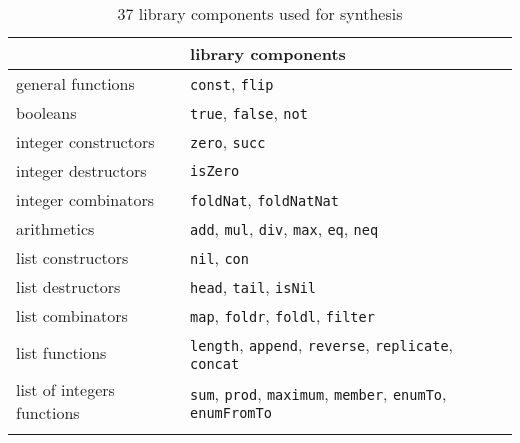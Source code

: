 \begin{longtable}{l  p{}}
\toprule
 & library components\\
\midrule
general functions & \lstinline!const!, \lstinline?flip?\\
booleans & \lstinline?true?, \lstinline?false?, \lstinline?not?\\
integer constructors & \lstinline?zero?, \lstinline?succ?\\
integer destructors & \lstinline?isZero?\\
integer combinators & \lstinline?foldNat?, \lstinline?foldNatNat?\\
arithmetics & \lstinline?add?, \lstinline?mul?, \lstinline?div?, \lstinline?max?, \lstinline?eq?, \lstinline?neq?\\
list constructors & \lstinline?nil?, \lstinline?con?\\
list destructors & \lstinline?head?, \lstinline?tail?, \lstinline?isNil?\\
list combinators & \lstinline?map?, \lstinline?foldr?, \lstinline?foldl?, \lstinline?filter?\\
list functions & \lstinline?length?, \lstinline?append?, \lstinline?reverse?, \lstinline?replicate?, \lstinline?concat?\\
list of integers functions & \lstinline?sum?, \lstinline?prod?, \lstinline?maximum?, \lstinline?member?, \lstinline?enumTo?, \lstinline?enumFromTo?\\
\bottomrule
\caption{37 library components used for synthesis\label{fig:library-components}}
\end{longtable}